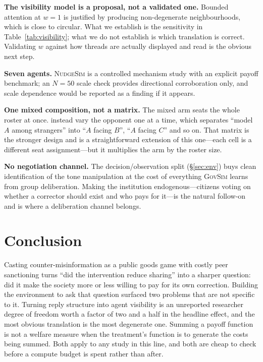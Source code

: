 \documentclass{article}
\begin{document}
\textbf{The visibility model is a proposal, not a validated one.} Bounded
attention at $w=1$ is justified by producing non-degenerate neighbourhoods,
which is close to circular. What we establish is the sensitivity in
Table~\ref{tab:visibility}; what we do not establish is which translation is
correct. Validating $w$ against how threads are actually displayed and read is
the obvious next step.

\textbf{Seven agents.} \textsc{NudgeSim} is a controlled mechanism study with an
explicit payoff benchmark; an $N=50$ scale check provides directional
corroboration only, and scale dependence would be reported as a finding if it
appears.

\textbf{One mixed composition, not a matrix.} The mixed arm seats the whole
roster at once. \citet{backmann2025moralsim} instead vary the opponent one at a
time, which separates ``model $A$ among strangers'' into ``$A$ facing $B$'',
``$A$ facing $C$'' and so on. That matrix is the stronger design and is a
straightforward extension of this one---each cell is a different seat
assignment---but it multiplies the arm by the roster size.

\textbf{No negotiation channel.} The decision/observation split
(\S\ref{sec:env}) buys clean identification of the tone manipulation at the cost
of everything \textsc{GovSim} learns from group deliberation. Making the
institution endogenous---citizens voting on whether a corrector should exist and
who pays for it---is the natural follow-on and is where a deliberation channel
belongs.

\section{Conclusion}

Casting counter-misinformation as a public goods game with costly peer
sanctioning turns ``did the intervention reduce sharing'' into a sharper
question: did it make the society more or less willing to pay for its own
correction. Building the environment to ask that question surfaced two problems
that are not specific to it. Turning reply structure into agent visibility is an
unreported researcher degree of freedom worth a factor of two and a half in the
headline effect, and the most obvious translation is the most degenerate one.
Summing a payoff function is not a welfare measure when the treatment's function
is to generate the costs being summed. Both apply to any study in this line, and
both are cheap to check before a compute budget is spent rather than after.



\end{document}
